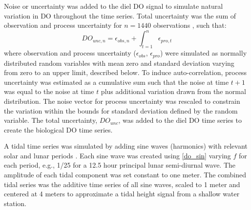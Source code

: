 \documentclass[letterpaper,12pt,oneside]{article}\usepackage[]{graphicx}\usepackage[]{color}
\begin{document}
Noise or uncertainty was added to the diel \ac{DO} signal to simulate natural variation in \ac{DO} throughout the time series.  Total uncertainty was the sum of observation and process uncertainty for $n = 1440$ observations \citep{Hilborn97}, such that:
\begin{equation}
DO_{unc, n} = \epsilon_{obs, n} + \int_{t = 1}^{n} \epsilon_{pro, t}
\end{equation}
where observation and process uncertainty ($\epsilon_{obs}$, $\epsilon_{pro}$) were simulated as normally distributed random variables with mean zero and standard deviation varying from zero to an upper limit, described below.  To induce auto-correlation, process uncertainty was estimated as a cumulative sum such that the noise at time $t+1$ was equal to the noise at time $t$ plus additional variation drawn from the normal distribution.  The noise vector for process uncertainty was rescaled to constrain the variation within the bounds for standard deviation defined by the random variable. The total uncertainty, $DO_{unc}$, was added to the diel \ac{DO} time series to create the biological \ac{DO} time series.

A tidal time series was simulated by adding sine waves (harmonics) with relevant solar and lunar periods \citep{Foreman89}.  Each sine wave was created using \cref{do_sin} varying $f$ for each period, e.g., 1/25 for a 12.5 hour principal lunar semi-diurnal wave.  The amplitude of each tidal component was set constant to one meter.  The combined tidal series was the additive time series of all sine waves, scaled to 1 meter and centered  at 4 meters to approximate a tidal height signal from a shallow water station.
\end{document}

